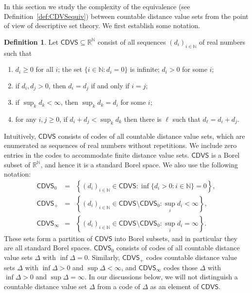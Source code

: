 \documentclass{amsart}
\theoremstyle{definition}
\newtheorem{definition}{Definition}[section]
\theoremstyle{remark}
\begin{document}
In this section we study the complexity of the equivalence (see Definition~\ref{def:CDVSequiv}) between countable distance value sets from the point of view of descriptive set theory. We first establish some notation.

\begin{definition}
        Let $\mathsf{CDVS}\subseteq \mathbb{R}^{\mathbb{N}}$ consist of all sequences $(d_i)_{i\in\mathbb{N}}$ of real numbers such that
\begin{enumerate}
\item[(a)] $d_i\geq 0$ for all $i$; the set $\{i\in\mathbb{N}\colon d_i=0\}$ is infinite; $d_i>0$ for some $i$;
\item[(b)] if $d_i, d_j>0$, then $d_i=d_j$ if and only if $i=j$;
\item[(c)] if $\sup_kd_k<\infty$, then $\sup_k d_k=d_{i}$ for some $i$;
\item[(d)] for any $i,j\geq 0$, if $d_i+d_j<\sup_kd_k$ then there is $\ell$ such that $d_{\ell}=d_i+d_j$.
\end{enumerate}
\end{definition}

Intuitively, $\mathsf{CDVS}$ consists of codes of all countable distance value sets, which are enumerated as sequences of real numbers without repetitions. We include zero entries in the codes to accommodate finite distance value sets. $\mathsf{CDVS}$ is a Borel subset of $\mathbb{R}^{\mathbb{N}}$, and hence it is a standard Borel space. We also use the following notation:
$$\begin{array}{lcl}
\mathsf{CDVS}_0&=&\left\{(d_i)_{i\in\mathbb{N}}\in \mathsf{CDVS}\colon \inf\{d_i>0\colon i\in\mathbb{N}\}=0 \right\}, \\
\mathsf{CDVS}_+&=&\left\{(d_i)_{i\in\mathbb{N}}\in \mathsf{CDVS}\setminus \mathsf{CDVS}_0\colon \sup_i d_i<\infty\right\},\\
\mathsf{CDVS}_\infty &=& \left\{(d_i)_{i\in\mathbb{N}}\in \mathsf{CDVS}\setminus \mathsf{CDVS}_0\colon \sup_i d_i=\infty\right\}. 
\end{array}$$
These sets form a partition of $\mathsf{CDVS}$ into Borel subsets, and in particular they are all standard Borel spaces. $\mathsf{CDVS}_0$ consists of codes of all countable distance value sets $\Delta$ with $\inf\Delta=0$. Similarly, $\mathsf{CDVS}_+$ codes countable distance value sets $\Delta$ with $\inf\Delta>0$ and $\sup\Delta<\infty$, and $\mathsf{CDVS}_\infty$ codes those $\Delta$ with $\inf\Delta>0$ and $\sup\Delta=\infty$. In our discussions below, we will not distinguish a countable distance value set $\Delta$ from a code of $\Delta$ as an element of $\mathsf{CDVS}$.
\end{document}
